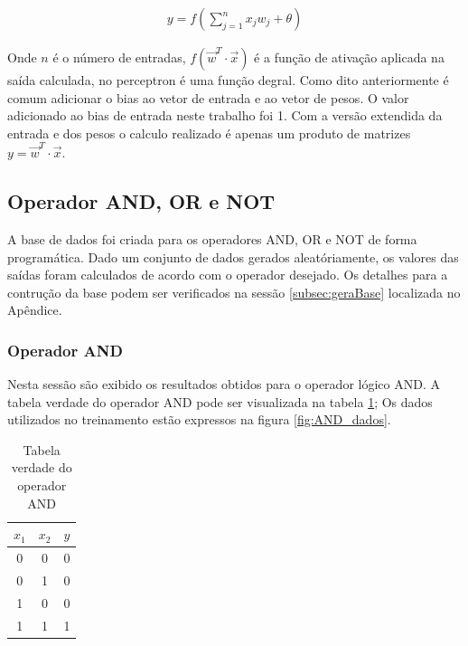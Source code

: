 \documentclass[12pt,journal,onecolumn]{IEEEtran}
\begin{document}
\begin{align}
	y=f(\sum_{j=1}^{n} x_j w_j + \theta)
\end{align}
 
Onde $n$ é o número de entradas,  $f(\overrightarrow{w}^T \cdot \overrightarrow{x})$ é a função de
ativação aplicada na saída calculada, no perceptron é uma função degral. Como
dito anteriormente é comum adicionar o bias ao vetor de entrada e ao vetor de pesos. O valor adicionado ao
bias de entrada neste trabalho foi 1. Com a versão extendida da entrada e dos
pesos o calculo realizado é apenas um produto de matrizes $y=
\overrightarrow{w}^T \cdot \overrightarrow{x}$.


\subsection{Operador AND, OR e NOT}
A base de dados foi criada para os operadores AND, OR e NOT de forma
programática. Dado um conjunto de dados gerados aleatóriamente, os valores das
saídas foram calculados de acordo com o operador desejado. Os detalhes para a
contrução da base podem ser verificados na sessão \ref{subsec:geraBase}
localizada no Apêndice.








\subsubsection{Operador AND}
Nesta sessão são exibido os resultados obtidos para o operador lógico AND.
A tabela verdade do operador AND pode ser visualizada na
tabela \ref{tab:verd_AND};
Os dados utilizados no treinamento estão expressos na figura \ref{fig:AND_dados}.


\begin{table}[!htbp]
\caption{Tabela verdade do operador AND}
\label{tab:verd_AND}
\centering
	\begin{tabular}{| c | c | c |}
		\hline
		 $x_1$  & $x_2$ 	& $y$ \\ \hline
		 0      & 0 		& 0 \\ \hline
		 0 		& 1 		& 0 \\ \hline
		 1 		& 0 		& 0 \\ \hline
		 1 		& 1 		& 1 \\
		\hline
	\end{tabular}
\end{table}
\end{document}
